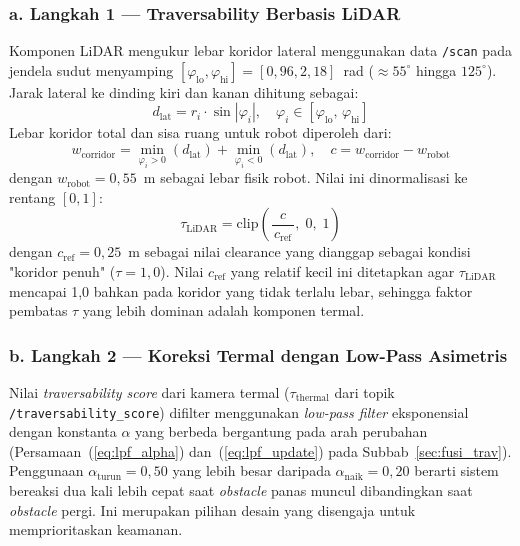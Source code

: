 \subsubsection*{a. Langkah 1 --- Traversability Berbasis LiDAR}

Komponen LiDAR mengukur lebar koridor lateral menggunakan data \texttt{/scan} pada jendela sudut menyamping $[\varphi_\text{lo}, \varphi_\text{hi}] = [0{,}96, 2{,}18]$~rad ($\approx 55^\circ$ hingga $125^\circ$). Jarak lateral ke dinding kiri dan kanan dihitung sebagai:
\begin{equation}
    d_\text{lat} = r_i \cdot \sin|\varphi_i|,
    \quad \varphi_i \in [\varphi_\text{lo},\, \varphi_\text{hi}]
    \label{eq:d_lat}
\end{equation}
Lebar koridor total dan sisa ruang untuk robot diperoleh dari:
\begin{equation}
    w_\text{corridor} = \min_{\varphi_i > 0}\!(d_\text{lat}) +
    \min_{\varphi_i < 0}\!(d_\text{lat}), \quad
    c = w_\text{corridor} - w_\text{robot}
    \label{eq:corridor_m}
\end{equation}
dengan $w_\text{robot} = 0{,}55$~m sebagai lebar fisik robot. Nilai ini dinormalisasi ke rentang $[0, 1]$:
\begin{equation}
    \tau_\text{LiDAR} = \mathrm{clip}\!\left(\frac{c}{\,c_\text{ref}\,},\;0,\;1\right)
    \label{eq:trav_lidar_apf}
\end{equation}
dengan $c_\text{ref} = 0{,}25$~m sebagai nilai clearance yang dianggap sebagai kondisi "koridor penuh" ($\tau = 1{,}0$). Nilai $c_\text{ref}$ yang relatif kecil ini ditetapkan agar $\tau_\text{LiDAR}$ mencapai 1,0 bahkan pada koridor yang tidak terlalu lebar, sehingga faktor pembatas $\tau$ yang lebih dominan adalah komponen termal.

\subsubsection*{b. Langkah 2 --- Koreksi Termal dengan Low-Pass Asimetris}

Nilai \textit{traversability score} dari kamera termal ($\tau_\text{thermal}$ dari topik \texttt{/traversability\_score}) difilter menggunakan \textit{low-pass filter} eksponensial dengan konstanta $\alpha$ yang berbeda bergantung pada arah perubahan (Persamaan~(\ref{eq:lpf_alpha}) dan~(\ref{eq:lpf_update}) pada Subbab~\ref{sec:fusi_trav}). Penggunaan $\alpha_\text{turun} = 0{,}50$ yang lebih besar daripada $\alpha_\text{naik} = 0{,}20$ berarti sistem bereaksi dua kali lebih cepat saat \textit{obstacle} panas muncul dibandingkan saat \textit{obstacle} pergi. Ini merupakan pilihan desain yang disengaja untuk memprioritaskan keamanan.

